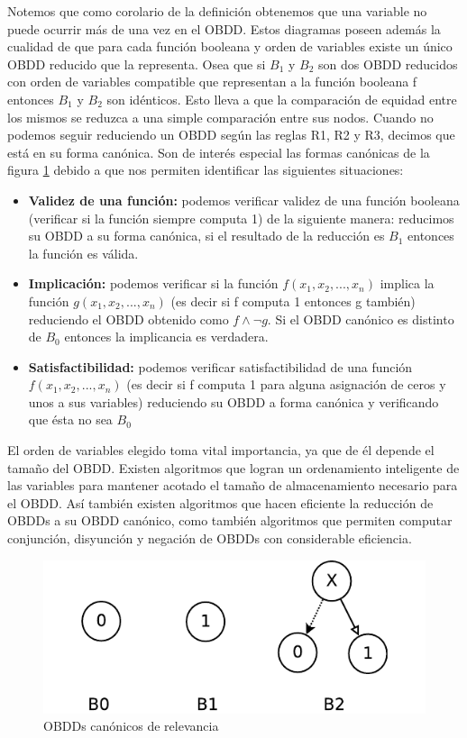 \documentclass[titlepage, 12pt]{book}
\begin{document}
Notemos que como corolario de la definici\'on obtenemos que una variable no puede ocurrir m\'as de una vez en el OBDD. Estos diagramas poseen adem\'as la cualidad de que para cada funci\'on booleana y orden de variables existe un \'unico OBDD reducido que la representa. Osea que si $B_1$ y $B_2$ son dos OBDD reducidos con orden de variables compatible que representan a la funci\'on booleana f entonces $B_1$ y $B_2$ son id\'enticos. Esto lleva a que la comparaci\'on de equidad entre los mismos se reduzca a una simple comparaci\'on entre sus nodos.
Cuando no podemos seguir reduciendo un OBDD seg\'un las reglas R1, R2 y R3, decimos que est\'a en su forma can\'onica. Son de inter\'es especial las formas can\'onicas de la figura \ref{canonicos} debido a que nos permiten identificar las siguientes situaciones:
\begin{itemize}
\item \textbf{Validez de una funci\'on:} podemos verificar validez de una funci\'on booleana (verificar si la funci\'on siempre computa 1) de la siguiente manera: reducimos su OBDD a su forma can\'onica, si el resultado de la reducci\'on es $B_1$ entonces la funci\'on es v\'alida.
\item \textbf{Implicaci\'on:} podemos verificar si la funci\'on $f(x_1,x_2,...,x_n)$ implica la funci\'on $g(x_1,x_2,...,x_n)$ (es decir si f computa 1 entonces g tambi\'en) reduciendo el OBDD obtenido como $f \wedge \neg g$. Si el OBDD can\'onico es distinto de $B_0$ entonces la implicancia es verdadera.
\item \textbf{Satisfactibilidad:} podemos verificar satisfactibilidad de una funci\'on $f(x_1,x_2,...,x_n)$ (es decir si f computa 1 para alguna asignaci\'on de ceros y unos a sus variables) reduciendo su OBDD a forma can\'onica y verificando que \'esta no sea $B_0$
\end{itemize}

El orden de variables elegido toma vital importancia, ya que de \'el depende el tama\~no del OBDD. Existen algoritmos que logran un ordenamiento inteligente de las variables para mantener acotado el tama\~no de almacenamiento necesario para el OBDD. As\'i tambi\'en existen algoritmos que hacen eficiente la reducci\'on de OBDDs a su OBDD can\'onico, como tambi\'en algoritmos que permiten computar conjunci\'on, disyunci\'on y negaci\'on de OBDDs con considerable eficiencia.\\


\begin{figure}
  \centering
    \includegraphics{Imagenes/canonicos.pdf}
  \caption{OBDDs can\'onicos de relevancia}
  \label{canonicos}
\end{figure}
~\\
\end{document}
